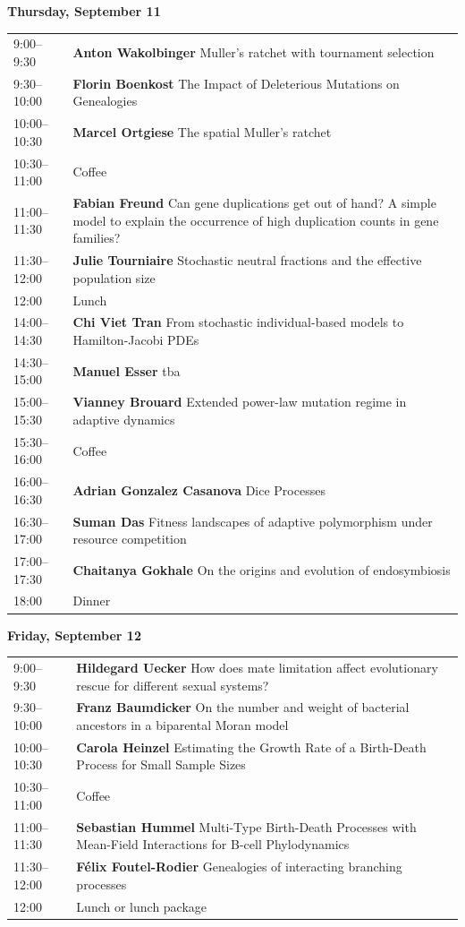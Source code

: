 \documentclass[12pt,a4paper]{article}
\begin{document}
\newpage

\textbf{\Large Thursday, September 11}\medskip

\begin{tabular}{@{}l p{}@{}}
9:00--9:30 &\textbf{Anton Wakolbinger } Muller's ratchet with tournament selection \\
9:30--10:00 &\textbf{Florin Boenkost } The Impact of Deleterious Mutations on Genealogies \\
10:00--10:30 &\textbf{Marcel Ortgiese } The spatial Muller's ratchet \\
10:30--11:00 & Coffee \\
11:00--11:30 &\textbf{Fabian Freund } Can gene duplications get out of hand? A simple model to explain the occurrence of high duplication counts in gene families? \\
11:30--12:00 &\textbf{Julie Tourniaire } Stochastic neutral fractions and the effective population size \\
12:00 & Lunch \\
14:00--14:30 &\textbf{Chi Viet Tran } From stochastic individual-based models to Hamilton-Jacobi PDEs \\
14:30--15:00 &\textbf{Manuel Esser } tba \\
15:00--15:30 &\textbf{Vianney Brouard } Extended power-law mutation regime in adaptive dynamics \\
15:30--16:00 & Coffee \\
16:00--16:30 &\textbf{Adrian Gonzalez Casanova } Dice Processes \\
16:30--17:00 &\textbf{Suman Das } Fitness landscapes of adaptive polymorphism under resource competition \\
17:00--17:30 &\textbf{Chaitanya Gokhale } On the origins and evolution of endosymbiosis \\
18:00 & Dinner \\
\end{tabular}

\newpage

\textbf{\Large Friday, September 12}\medskip

\begin{tabular}{@{}l p{}@{}}
9:00--9:30 &\textbf{Hildegard Uecker } How does mate limitation affect evolutionary rescue for different sexual systems? \\
9:30--10:00 &\textbf{Franz Baumdicker } On the number and weight of bacterial ancestors in a biparental Moran model \\
10:00--10:30 &\textbf{Carola Heinzel } Estimating the Growth Rate of a Birth-Death Process for Small Sample Sizes \\
10:30--11:00 & Coffee \\
11:00--11:30 &\textbf{Sebastian Hummel } Multi-Type Birth-Death Processes with Mean-Field Interactions for B-cell Phylodynamics \\
11:30--12:00 &\textbf{Félix Foutel-Rodier } Genealogies of interacting branching processes \\
12:00 & Lunch or lunch package \\
\end{tabular}
\end{document}

